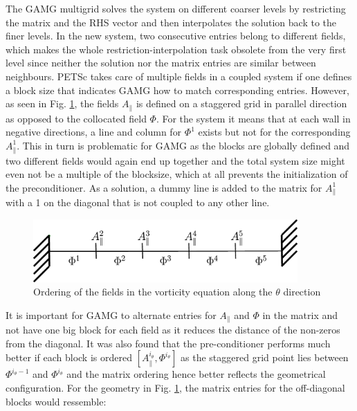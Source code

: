 The GAMG multigrid solves the system on different coarser levels by restricting the matrix and the RHS vector and then interpolates the solution back to the finer levels. In the new system, two consecutive entries belong to different fields, which makes the whole restriction-interpolation task obsolete from the very first level since neither the solution nor the matrix entries are similar between neighbours. PETSc takes care of multiple fields in a coupled system if one defines a block size that indicates GAMG how to match corresponding entries. However, as seen in Fig. \ref{fig:impl_staggeredFieldMatrix}, the fields $A_\parallel$ is defined on a staggered grid in parallel direction as opposed to the collocated field $\Phi$. For the system it means that at each wall in negative directions, a line and column for $\Phi^1$ exists but not for the  corresponding $A_\parallel^1$. This in turn is problematic for GAMG as the blocks are globally defined and two different fields would again end up together and the total system size might even not be a multiple of the blocksize, which at all prevents the initialization of the preconditioner. As a solution, a dummy line is added to the matrix for $A_\parallel^1$ with a 1 on the diagonal that is not coupled to any other line. \\

\begin{figure}[H]
	\centering
	\includegraphics[width=0.9\textwidth]{schemes/staggeredMatrixLocation.jpg}
	\caption[Sketches of the mesh around the X-point]{Ordering of the fields in the vorticity equation along the $\theta$ direction}
	\label{fig:impl_staggeredFieldMatrix}
\end{figure}

It is important for GAMG to alternate entries for $A_\parallel$ and $\Phi$ in the matrix and not have one big block for each field as it reduces the distance of the non-zeros from the diagonal. It was also found that the pre-conditioner performs much better if each block is ordered $[A_\parallel^{i_\theta},\Phi^{i_\theta}]$ as the staggered grid point lies between $\Phi^{i_\theta-1}$ and $\Phi^{i_\theta}$ and the matrix ordering hence better reflects the geometrical configuration. For the geometry in Fig. \ref{fig:impl_staggeredFieldMatrix}, the matrix entries for the off-diagonal blocks would ressemble: 


